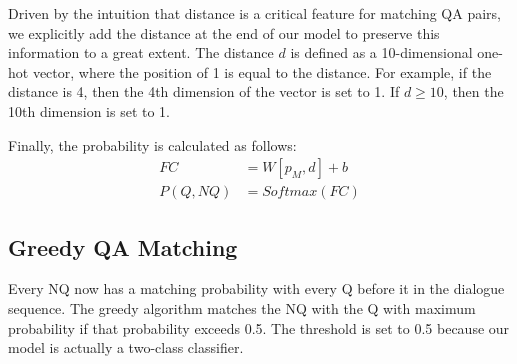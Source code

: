 Driven by the intuition that distance is a critical feature 
for matching QA pairs, %
we explicitly add the distance at the end of our model to preserve 
this information to a great extent. The distance $d$ is defined as 
a 10-dimensional one-hot vector, where the position of 
1 is equal to the distance. For example, if the distance is 4, then
the 4th dimension of the vector is set to 1. If $d\geq 10$, then the 10th
dimension is set to 1.

Finally, the probability is calculated as follows:
\begin{equation}
\begin{aligned}
FC&=W[p_M,d]+b\\
P(Q,NQ)&=Softmax(FC)
\end{aligned}
\end{equation}

\subsection{Greedy QA Matching}

Every NQ now has a matching probability with every Q 
before it in the dialogue sequence. The greedy algorithm matches the NQ with the
Q with maximum probability if that probability exceeds 0.5.
The threshold is set to 0.5 because our model is actually a two-class classifier.













